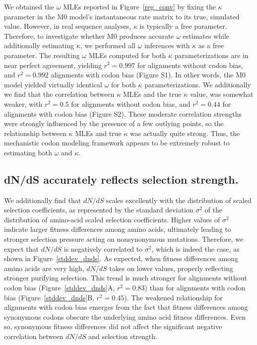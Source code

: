\documentclass{pnastwo}
\begin{document}
\begin{article}
We obtained the $\omega$ MLEs reported in Figure~\ref{reg_conv} by fixing the $\kappa$ parameter in the M0 model's instantaneous rate matrix to its true, simulated value. However, in real sequence analyses, $\kappa$ is typically a free parameter. Therefore, to investigate whether M0 produces accurate $\omega$ estimates while additionally estimating $\kappa$, we performed all $\omega$ inferences with $\kappa$ as a free parameter. The resulting $\omega$ MLEs computed for both $\kappa$ parameterizations are in near perfect agreement, yielding $r^2=0.997$ for alignments without codon bias, and $r^2=0.992$ alignments with codon bias (Figure S1). In other words, the M0 model yielded virtually identical $\omega$ for both $\kappa$ parameterizations. We additionally we find that the correlation between $\kappa$ MLEs and the true $\kappa$ value, was somewhat weaker, with $r^2=0.5$ for alignments without codon bias, and $r^2=0.44$ for alignments with codon bias (Figure S2). These moderate correlation strengths were strongly influenced by the presence of a few outlying points, so the relationship between $\kappa$ MLEs and true $\kappa$ was actually quite strong. Thus, the mechanistic codon modeling framework appears to be extremely robust to estimating both $\omega$ and $\kappa$.  

\subsection*{dN/dS accurately reflects selection strength.}

We additionally find that $dN/dS$ scales excellently with the distribution of scaled selection coefficients, as represented by the standard deviation $\sigma^2$ of the distribution of amino-acid scaled selection coefficients. Higher values of $\sigma^2$ indicate larger fitness differences among amino acids, ultimately leading to stronger selection pressure acting on nonsynonymous mutations. Therefore, we expect that $dN/dS$ is negatively correlated to $\sigma^2$, which is indeed the case, as shown in Figure~\ref{stddev_dnds}. As expected, when fitness differences among amino acids are very high, $dN/dS$ takes on lower values, properly reflecting stronger purifying selection. This trend is much stronger for alignments without codon bias (Figure~\ref{stddev_dnds}A, $r^2 = 0.83$) than for alignments with codon bias (Figure~\ref{stddev_dnds}B, $r^2 = 0.45$). The weakened relationship for alignments with codon bias emerges from the fact that fitness differences among synonymous codons obscure the underlying amino acid fitness differences. Even so, synonymous fitness differences did not affect the significant negative correlation between $dN/dS$ and selection strength.


\end{article}
\end{document}
